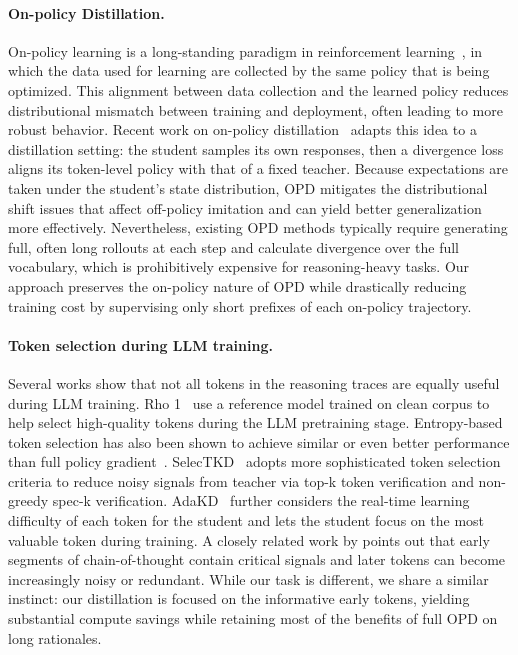 \documentclass[11pt]{article}
\begin{document}
\paragraph{On-policy Distillation.}  
On-policy learning is a long-standing paradigm in reinforcement learning~\cite{williams1992simple,rummery1994line}, in which the data used for learning are collected by the same policy that is being optimized. This alignment between data collection and the learned policy reduces distributional mismatch between training and deployment, often leading to more robust behavior. Recent work on on-policy distillation~\citep{lin-etal-2020-autoregressive,gu2024minillm,Ko2024DistiLLMTS,agarwal2024policy,lu2025onpolicydistillation,Ko2025DistiLLM2AC} adapts this idea to a distillation setting: the student samples its own responses, then a divergence loss aligns its token-level policy with that of a fixed teacher. Because expectations are taken under the student's state distribution, OPD mitigates the distributional shift issues that affect off-policy imitation and can yield better generalization more effectively.
Nevertheless, existing OPD methods typically require generating full, often long rollouts at each step and calculate divergence over the full vocabulary, which is prohibitively expensive for reasoning-heavy tasks. Our approach preserves the on-policy nature of OPD while drastically reducing training cost by supervising only short prefixes of each on-policy trajectory.  



\paragraph{Token selection during LLM training.}  
Several works show that not all tokens in the reasoning traces are equally useful during LLM training. 
Rho 1~\cite{Lin2024Rho1NA} use a reference model trained on clean corpus to help select high-quality tokens during the LLM pretraining stage.
Entropy-based token selection has also been shown to achieve similar or even better performance than full policy gradient~\citep{wang2025beyond}. 
SelecTKD~\cite{huang2025selectkd} adopts more sophisticated token selection criteria to reduce noisy signals from teacher via top-k token verification and non-greedy spec-k verification.  
AdaKD~\cite{Xie2025LLMOrientedTK} further considers the real-time learning difficulty of each token for the student and lets the student focus on the most valuable token during training.
A closely related work by \citet{ji2025first} points out that early segments of chain-of-thought contain critical signals and later tokens can become increasingly noisy or redundant. While our task is different, we share a similar instinct: our distillation is focused on the informative early tokens, yielding substantial compute savings while retaining most of the benefits of full OPD on long rationales.  
\end{document}
